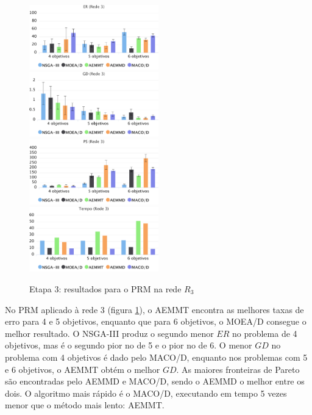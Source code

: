 \begin{figure}[!htbp]
	\caption{Etapa 3: resultados para o PRM na rede $R_3$}
	\label{fig_exp3_prm_r3}
	\includegraphics[width=0.5\textwidth]{cap_experimentos/figs/etapa3/er-mrp-r3}
	\includegraphics[width=0.5\textwidth]{cap_experimentos/figs/etapa3/gd-mrp-r3}
	\includegraphics[width=0.5\textwidth]{cap_experimentos/figs/etapa3/ps-mrp-r3}
	\includegraphics[width=0.5\textwidth]{cap_experimentos/figs/etapa3/time-mrp-r3}
\end{figure}

No PRM aplicado à rede 3 (figura \ref{fig_exp3_prm_r3}), o AEMMT encontra as melhores taxas de erro para 4 e 5 objetivos, enquanto que para 6 objetivos, o MOEA/D consegue o melhor resultado. O NSGA-III produz o segundo menor $ER$ no problema de 4 objetivos, mas é o segundo pior no de 5 e o pior no de 6. O menor $GD$ no problema com 4 objetivos é dado pelo MACO/D, enquanto nos problemas com 5 e 6 objetivos, o AEMMT obtém o melhor $GD$. As maiores fronteiras de Pareto são encontradas pelo AEMMD e MACO/D, sendo o AEMMD o melhor entre os dois. O algoritmo mais rápido é o MACO/D, executando em tempo 5 vezes menor que o método mais lento: AEMMT.


